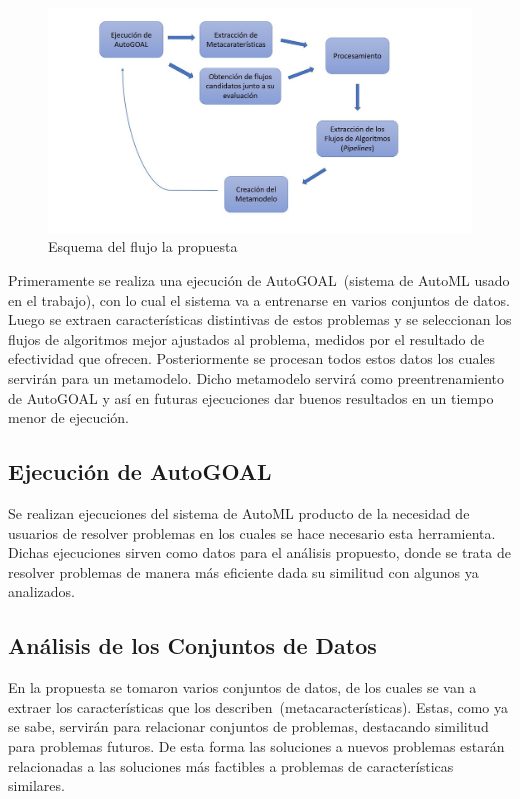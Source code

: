 \begin{figure}[H]
    \centering
    \includegraphics[scale=.5]{Figures/proposal-flow.jpg}
    \caption{Esquema del flujo la propuesta}
    \label{fig:prop-flow}
\end{figure}

Primeramente se realiza una ejecución de AutoGOAL~(sistema de AutoML usado en el
trabajo), con lo cual el sistema va a entrenarse en varios conjuntos de datos.
Luego se extraen características distintivas de estos problemas y se
seleccionan los flujos de algoritmos mejor ajustados al problema, medidos por
el resultado de efectividad que ofrecen. Posteriormente se procesan todos estos
datos los cuales servirán para un metamodelo. Dicho metamodelo servirá como
preentrenamiento de AutoGOAL y así en futuras ejecuciones dar buenos
resultados en un tiempo menor de ejecución.



\subsection{Ejecución de AutoGOAL}

Se realizan ejecuciones del sistema de AutoML producto de la necesidad de
usuarios de resolver problemas en los cuales se hace necesario esta herramienta.
Dichas ejecuciones sirven como datos para el análisis propuesto, donde se trata
de resolver problemas de manera más eficiente dada su similitud con algunos ya
analizados. 

\subsection{Análisis de los Conjuntos de Datos}

En la propuesta se tomaron varios conjuntos de datos, de los cuales se van a
extraer los características que los describen~(metacaracterísticas). Estas, como
ya se sabe, servirán para relacionar conjuntos de problemas, destacando
similitud para problemas futuros. De esta forma las soluciones a nuevos
problemas estarán relacionadas a las soluciones más factibles a problemas de
características similares. 

